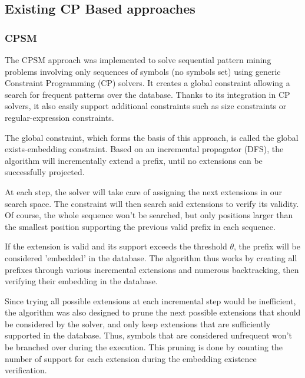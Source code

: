 \documentclass{eplmastersthesis}
\begin{document}
\subsection{Existing CP Based approaches}
\subsubsection{CPSM}

The CPSM approach \cite{negrevergne2015constraint} was implemented to solve sequential pattern mining problems involving only sequences of symbols (no symbols set) using generic Constraint Programming (CP) solvers. It creates a global constraint allowing a search for frequent patterns over the database. Thanks to its integration in CP solvers, it also easily support additional constraints such as size constraints or regular-expression constraints. \newline

The global constraint, which forms the basis of this approach, is called the global exists-embedding constraint. Based on an incremental propagator (DFS), the algorithm will incrementally extend a prefix, until no extensions can be successfully projected. \newline

At each step, the solver will take care of assigning the next extensions in our search space. The constraint will then search said extensions to verify its validity. Of course, the whole sequence won't be searched, but only positions larger than the smallest position supporting the previous valid prefix in each sequence. \newline

If the extension is valid and its support exceeds the threshold $\theta$, the prefix will be considered 'embedded' in the database. The algorithm thus works by creating all prefixes through various incremental extensions and numerous backtracking, then verifying their embedding in the database. \newline

Since trying all possible extensions at each incremental step would be inefficient, the algorithm was also designed to prune the next possible extensions that should be considered by the solver, and only keep extensions that are sufficiently supported in the database. Thus, symbols that are considered unfrequent won't be branched over during the execution. This pruning is done by counting the number of support for each extension during the embedding existence verification. \newline
\end{document}

